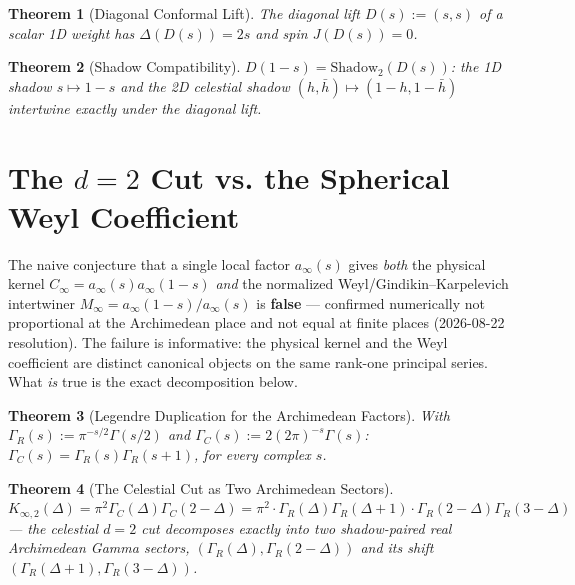 \documentclass{report}
\newtheorem{theorem}{Theorem}[chapter]
\theoremstyle{definition}
\begin{document}
\begin{theorem}[Diagonal Conformal Lift]
  \label{thm:diagonal-lift}
  \leanok
  The diagonal lift $D(s):=(s,s)$ of a scalar 1D weight has $\Delta(D(s))=2s$ and spin
  $J(D(s))=0$.
\end{theorem}

\begin{theorem}[Shadow Compatibility]
  \label{thm:shadow-compatibility}
  \leanok
  $D(1-s) = \mathrm{Shadow}_2(D(s))$: the 1D shadow $s\mapsto1-s$ and the 2D celestial shadow
  $(h,\bar h)\mapsto(1-h,1-\bar h)$ intertwine exactly under the diagonal lift.
\end{theorem}

\section{The \texorpdfstring{$d=2$}{d=2} Cut vs. the Spherical Weyl Coefficient}

The naive conjecture that a single local factor $a_\infty(s)$ gives \emph{both} the physical
kernel $C_\infty=a_\infty(s)a_\infty(1-s)$ \emph{and} the normalized Weyl/Gindikin--Karpelevich
intertwiner $M_\infty=a_\infty(1-s)/a_\infty(s)$ is \textbf{false} --- confirmed numerically
not proportional at the Archimedean place and not equal at finite places (2026-08-22
resolution). The failure is informative: the physical kernel and the Weyl coefficient are
distinct canonical objects on the same rank-one principal series. What \emph{is} true is the
exact decomposition below.

\begin{theorem}[Legendre Duplication for the Archimedean Factors]
  \label{thm:gammaC-gammaR-duplication}
  \leanok
  With $\Gamma_R(s):=\pi^{-s/2}\Gamma(s/2)$ and $\Gamma_C(s):=2(2\pi)^{-s}\Gamma(s)$:
  $\Gamma_C(s) = \Gamma_R(s)\Gamma_R(s+1)$, for every complex $s$.
\end{theorem}

\begin{theorem}[The Celestial Cut as Two Archimedean Sectors]
  \label{thm:archkernel-gammaR-sectors}
  \leanok
  $K_{\infty,2}(\Delta) = \pi^2\Gamma_C(\Delta)\Gamma_C(2-\Delta) =
  \pi^2\cdot\Gamma_R(\Delta)\Gamma_R(\Delta+1)\cdot\Gamma_R(2-\Delta)\Gamma_R(3-\Delta)$ ---
  the celestial $d=2$ cut decomposes exactly into two shadow-paired real Archimedean Gamma
  sectors, $(\Gamma_R(\Delta),\Gamma_R(2-\Delta))$ and its shift
  $(\Gamma_R(\Delta+1),\Gamma_R(3-\Delta))$.
\end{theorem}
\end{document}
